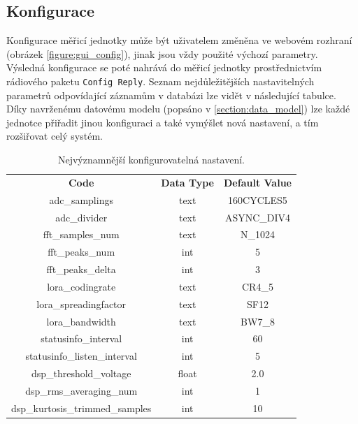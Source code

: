  
    
 
\subsection{Konfigurace}
\label{section:config}
    Konfigurace měřicí jednotky může být uživatelem změněna ve webovém rozhraní (obrázek \ref{figure:gui_config}), jinak jsou vždy použité výchozí parametry. Výsledná konfigurace se poté nahrává do měřicí jednotky prostřednictvím rádiového paketu \texttt{Config Reply}. Seznam nejdůležitějších nastavitelných parametrů odpovídající záznamům v databázi lze vidět v následující tabulce.\\
    Díky navrženému datovému modelu (popsáno v \ref{section:data_model}) lze každé jednotce přiřadit jinou konfiguraci a také vymýšlet nová nastavení, a tím rozšiřovat celý systém. 
   
    \begin{table}[H]
        \begin{ctucolortab}
        \begin{tabular}{c!{\vrule width 2pt}c!{\vrule width 2pt}c}
            \textbf{Code} &  \textbf{Data Type} &  \textbf{Default Value} \\ 
            \Xhline{4\arrayrulewidth}
            adc\_samplings & text & 160CYCLES5 \\
            \hline
            adc\_divider & text & ASYNC\_DIV4 \\
            \hline
            fft\_samples\_num  & text & N\_1024\\ 
            \hline
            fft\_peaks\_num  & int & 5 \\ 
           \hline
            fft\_peaks\_delta  & int & 3 \\ 
           \hline
            lora\_codingrate  & text & CR4\_5 \\ 
           \hline
            lora\_spreadingfactor  & text & SF12 \\ 
            \hline
            lora\_bandwidth  & text & BW7\_8 \\ 
            \hline
            statusinfo\_interval  & int & 60 \\ 
            \hline
            statusinfo\_listen\_interval  & int & 5\\ 
            \hline
            dsp\_threshold\_voltage & float & 2.0\\ 
            \hline
            dsp\_rms\_averaging\_num & int & 1\\ 
            \hline
            dsp\_kurtosis\_trimmed\_samples & int & 10\\
        \end{tabular}
        \end{ctucolortab}
        \caption{Nejvýznamnější konfigurovatelná nastavení.}
        \label{table:config}
    \end{table}


